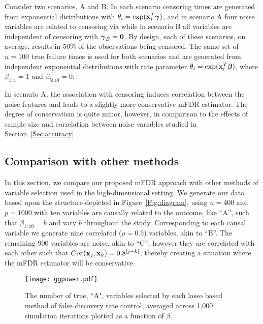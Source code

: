 Consider two scenarios, A and B. In each scenario censoring times are generated from exponential distributions with $\theta_{i} = \exp(\mathbf{x}_i^T \boldsymbol{\gamma})$, and in scenario A four noise variables are related to censoring via
while in scenario B all variables are independent of censoring with $\boldsymbol{\gamma}_B = \mathbf{0}$.  By design, each of these scenarios, on average, results in 50\% of the observations being censored.  The same set of $n = 100$ true failure times is used for both scenarios and are generated from independent exponential distributions with rate parameter $\theta_i = \exp(\mathbf{x}_i^T \boldsymbol{\beta})$, where $\beta_{1:4} = 1$ and $\beta_{5:40} = 0$.

In scenario A, the association with censoring induces correlation between the noise features and leads to a slightly more conservative mFDR estimator. The degree of conservatism is quite minor, however, in comparison to the effects of sample size and correlation between noise variables studied in Section~\ref{Sec:accuracy}.

\subsection{Comparison with other methods}
\label{Sec:sim-comp}

In this section, we compare our proposed mFDR approach with other methods of variable selection used in the high-dimensional setting. We generate our data based upon the structure depicted in Figure~\ref{Fig:diagram}, using $n = 400$ and $p = 1000$ with ten variables are causally related to the outcome, like ``A'', such that $\beta_{1:10} = b$ and vary $b$ throughout the study. Corresponding to each causal variable we generate nine correlated ($\rho = 0.5$) variables, akin to ``B''. The remaining 900 variables are noise, akin to ``C'', however they are correlated with each other such that $Cor(\mathbf{x}_j,\mathbf{x}_k) = 0.8^{|j - k|}$, thereby creating a situation where the mFDR estimator will be conservative.

\begin{figure} [b!]
 \centering
  \texttt{[image: ggpower.pdf]}
  \caption{\label{Fig:lassopower} The number of true, ``A", variables selected by each lasso based method of false discovery rate control, averaged across 1,000 simulation iterations plotted as a function of $\beta$. }
\end{figure}

